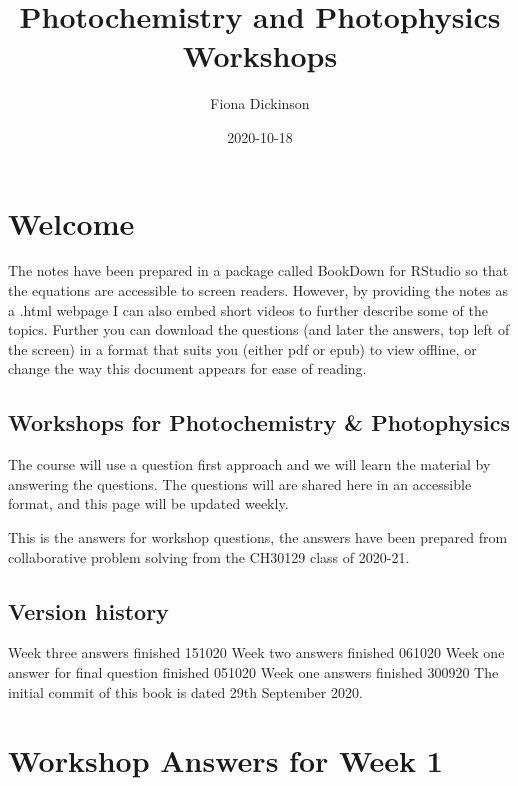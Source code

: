 \documentclass[
]{book}
\title{Photochemistry and Photophysics Workshops}
\author{Fiona Dickinson}
\date{2020-10-18}
\begin{document}
\maketitle

{
\setcounter{tocdepth}{1}
\tableofcontents
}
\hypertarget{welcome}{%
\chapter*{Welcome}\label{welcome}}

The notes have been prepared in a package called BookDown for RStudio so that the equations are accessible to screen readers. However, by providing the notes as a .html webpage I can also embed short videos to further describe some of the topics. Further you can download the questions (and later the answers, top left of the screen) in a format that suits you (either pdf or epub) to view offline, or change the way this document appears for ease of reading.

\hypertarget{workshops-for-photochemistry-photophysics}{%
\section*{Workshops for Photochemistry \& Photophysics}\label{workshops-for-photochemistry-photophysics}}

The course will use a question first approach and we will learn the material by answering the questions. The questions will are shared here in an accessible format, and this page will be updated weekly.

This is the answers for workshop questions, the answers have been prepared from collaborative problem solving from the CH30129 class of 2020-21.

\hypertarget{version-history}{%
\section*{Version history}\label{version-history}}

Week three answers finished 151020
Week two answers finished 061020
Week one answer for final question finished 051020
Week one answers finished 300920
The initial commit of this book is dated 29th September 2020.

\hypertarget{ch:Workshop1}{%
\chapter{Workshop Answers for Week 1}\label{ch:Workshop1}}
\end{document}
